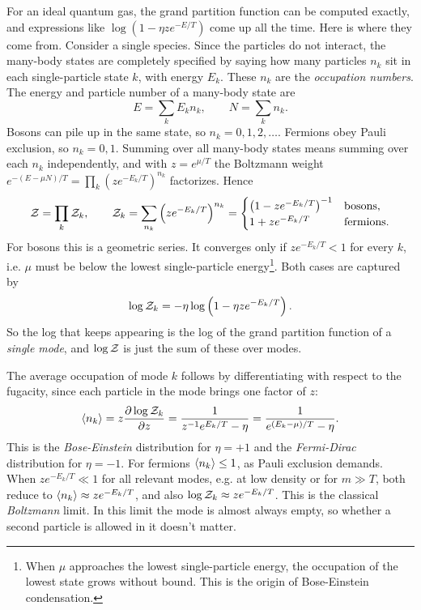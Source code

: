 For an ideal quantum gas, the grand partition function can be computed
exactly, and expressions like $\log(1-\eta ze^{-E/T})$ come up all the time.
Here is where they come from. Consider a single species. Since the particles do
not interact, the many-body states are completely specified by saying how many
particles $n_k$ sit in each single-particle state $k$, with energy $E_k$. These
$n_k$ are the {\it occupation numbers}. The energy and particle number of a
many-body state are
\begin{equation}
  E=\sum_kE_kn_k,\qquad N=\sum_kn_k.
\end{equation}
Bosons can pile up in the same state, so $n_k=0,1,2,\ldots$. Fermions obey
Pauli exclusion, so $n_k=0,1$. Summing over all many-body states means summing
over each $n_k$ independently, and with $z=e^{\mu/T}$ the Boltzmann weight
$e^{-(E-\mu N)/T}=\prod_k\left(ze^{-E_k/T}\right)^{n_k}$ factorizes. Hence
\begin{equation}
  \mathcal{Z}=\prod_k\mathcal{Z}_k,\qquad
  \mathcal{Z}_k=\sum_{n_k}\left(ze^{-E_k/T}\right)^{n_k}
  =\begin{cases}
     \left(1-ze^{-E_k/T}\right)^{-1} & \text{bosons},\\
     1+ze^{-E_k/T} & \text{fermions}.
   \end{cases}
\end{equation}
For bosons this is a geometric series. It converges only if $ze^{-E_k/T}<1$ for
every $k$, i.e. $\mu$ must be below the lowest single-particle
energy\footnote{When $\mu$ approaches the lowest single-particle energy, the occupation of the
lowest state grows without bound. This is the origin of Bose-Einstein
condensation.}. Both cases are
captured by
\begin{equation}\label{eq:logZmode}
  \log\mathcal{Z}_k=-\eta\log\left(1-\eta ze^{-E_k/T}\right).
\end{equation}
So the log that keeps appearing is the log of the grand partition function of a
{\it single mode}, and $\log\mathcal{Z}$ is just the sum of these over modes.

The average occupation of mode $k$ follows by differentiating with respect to the
fugacity, since each particle in the mode brings one factor of $z$:
\begin{equation}\label{eq:occupation}
  \expval{n_k}=z\pdv{\log\mathcal{Z}_k}{z}
  =\frac{1}{z^{-1}e^{E_k/T}-\eta}
  =\frac{1}{e^{(E_k-\mu)/T}-\eta}.
\end{equation}
This is the {\it Bose-Einstein} distribution
for $\eta=+1$ and the {\it Fermi-Dirac}
distribution for $\eta=-1$. For fermions $\expval{n_k}\leq1$, as Pauli
exclusion demands. When $ze^{-E_k/T}\ll1$ for all relevant modes, e.g. at low
density or for $m\gg T$, both reduce to $\expval{n_k}\approx ze^{-E_k/T}$, and
also $\log\mathcal{Z}_k\approx ze^{-E_k/T}$. This is the classical
{\it Boltzmann} limit. In this limit the mode is
almost always empty, so whether a second particle is allowed in it doesn't
matter.

